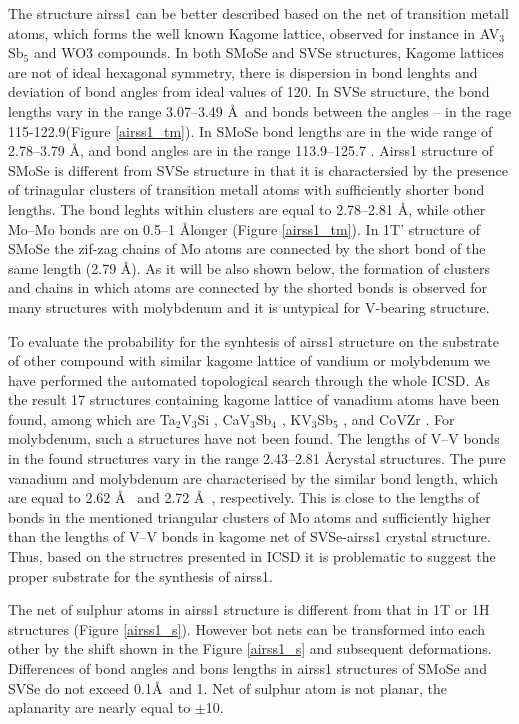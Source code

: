 \documentclass[a4paperm]{article}
\begin{document}
The structure airss1 can be better described based on the net of transition metall atoms, which forms the well known Kagome lattice\cite{zhang2021_kagome}, observed for instance in AV$_3$Sb$_5$ \cite{ortiz2021} and WO3 \cite{gerand1979} compounds.
In both SMoSe and SVSe structures, Kagome lattices are not of ideal hexagonal symmetry, there is dispersion in bond lenghts and deviation of bond angles from ideal values of 120\textdegree.
In SVSe  structure, the bond lengths vary in the range 3.07--3.49 \AA\ and bonds between the angles – in the rage 115-122.9\textdegree (Figure \ref{airss1_tm}).
In SMoSe bond lengths are in the wide range of 2.78--3.79 \AA, and bond angles are in the range 113.9--125.7 \textdegree.
Airss1 structure of SMoSe is different from SVSe structure in that it is charactersied by the presence of trinagular clusters of transition metall atoms with sufficiently shorter bond lengths.
The bond leghts within clusters are equal to 2.78--2.81 \AA, while other Mo--Mo bonds are on 0.5--1 \AA longer (Figure \ref{airss1_tm}).
In 1T' structure of SMoSe the zif-zag chains of Mo atoms are connected by the short bond of the same length (2.79 \AA).
As it will be also shown below, the formation of clusters and chains in which atoms are connected by the shorted bonds is observed for many structures with molybdenum and it is untypical for V-bearing structure.

To evaluate the probability for the synhtesis of airss1 structure on the substrate of other compound with similar kagome lattice of vandium or molybdenum we have performed the automated topological search through the whole ICSD.
As the result 17 structures containing kagome lattice of vanadium atoms have been found, among which are Ta$_2$V$_3$Si \cite{Ta2V3Si}, CaV$_3$Sb$_4$ \cite{ CaV3Sb4}, KV$_3$Sb$_5$ \cite{KV3Sb5}, and CoVZr \cite{ZrVCO}.
For molybdenum, such a structures have not been found.
The lengths of V--V bonds in the found structures vary in the range 2.43--2.81 \AA  crystal structures.
The pure vanadium and molybdenum are characterised by the similar bond length, which are equal to 2.62 \AA\ \cite{vanadium} and 2.72 \AA\ \cite{molybdenum}, respectively.
This is close to the lengths of bonds in the mentioned triangular clusters of Mo atoms and sufficiently higher than the lengths of V--V bonds in kagome net of SVSe-airss1 crystal structure.
Thus, based on the structres presented in ICSD it is problematic to suggest the proper substrate for the synthesis of airss1.


The net of sulphur atoms in airss1 structure is different from that in 1T or 1H structures (Figure \ref{airss1_s}).
However bot nets can be transformed into each other by the shift shown in the Figure \ref{airss1_s} and subsequent deformations.
Differences of bond angles and bons lengths in airss1 structures of SMoSe and SVSe do not exceed 0.1\AA\ and 1\textdegree.
Net of sulphur atom is not planar, the aplanarity are nearly equal to $\pm$10\textdegree.
\end{document}
